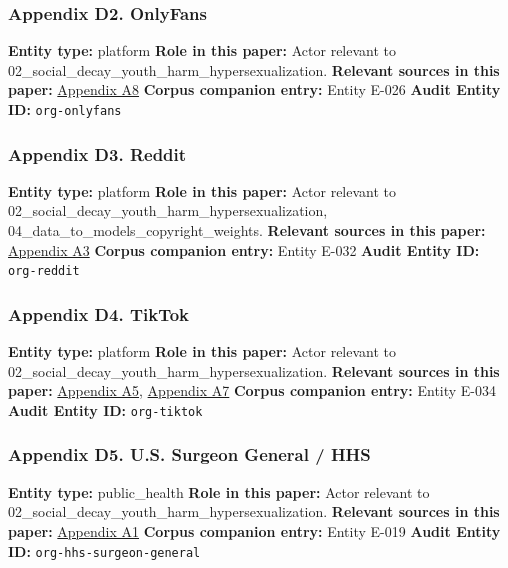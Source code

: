 \documentclass[
  american,
  11pt,
  letterpaper,
]{article}
\begin{document}
\subsubsection{Appendix D2. OnlyFans}\label{ch-02-appendix-d2-onlyfans}

\textbf{Entity type:} platform \textbf{Role in this paper:} Actor
relevant to 02\_social\_decay\_youth\_harm\_hypersexualization.
\textbf{Relevant sources in this paper:}
\hyperref[ch-02-appendix-a8-nudes-shouldn-t-i-charge-for-these-motivations-of-new-sexual-content-creators-on-onlyfans]{Appendix
A8} \textbf{Corpus companion entry:} Entity E-026 \textbf{Audit Entity
ID:} \texttt{org-onlyfans}

\subsubsection{Appendix D3. Reddit}\label{ch-02-appendix-d3-reddit}

\textbf{Entity type:} platform \textbf{Role in this paper:} Actor
relevant to 02\_social\_decay\_youth\_harm\_hypersexualization,
04\_data\_to\_models\_copyright\_weights. \textbf{Relevant sources in
this paper:}
\hyperref[ch-02-appendix-a3-quantifying-social-organization-and-political-polarization-in-online-platforms]{Appendix
A3} \textbf{Corpus companion entry:} Entity E-032 \textbf{Audit Entity
ID:} \texttt{org-reddit}

\subsubsection{Appendix D4. TikTok}\label{ch-02-appendix-d4-tiktok}

\textbf{Entity type:} platform \textbf{Role in this paper:} Actor
relevant to 02\_social\_decay\_youth\_harm\_hypersexualization.
\textbf{Relevant sources in this paper:}
\hyperref[ch-02-appendix-a5-when-kids-mode-isn-t-for-kids-investigating-tiktok-s-under-13-experience]{Appendix
A5},
\hyperref[ch-02-appendix-a7-social-media-algorithms-amplifying-misogynistic-content]{Appendix
A7} \textbf{Corpus companion entry:} Entity E-034 \textbf{Audit Entity
ID:} \texttt{org-tiktok}

\subsubsection{Appendix D5. U.S. Surgeon General /
HHS}\label{ch-02-appendix-d5-u-s-surgeon-general-hhs}

\textbf{Entity type:} public\_health \textbf{Role in this paper:} Actor
relevant to 02\_social\_decay\_youth\_harm\_hypersexualization.
\textbf{Relevant sources in this paper:}
\hyperref[ch-02-appendix-a1-social-media-and-youth-mental-health-the-u-s-surgeon-general-s-advisory]{Appendix
A1} \textbf{Corpus companion entry:} Entity E-019 \textbf{Audit Entity
ID:} \texttt{org-hhs-surgeon-general}
\end{document}
